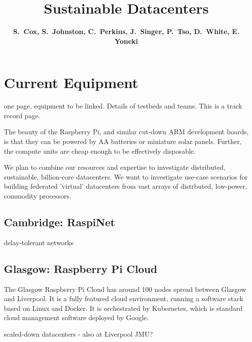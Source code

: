 \documentclass[a4paper,11pt]{article}
\begin{document}
\title{\Large \bfseries Sustainable Datacenters \vspace{-4mm}}
\author{\vspace{-5mm} \textbf{\normalsize S.\ Cox, S.\ Johnston, C.\ Perkins, J.\ Singer,  P.\ Tso, D.\ White, E. Yoneki}}
\date{\vspace{-6mm}}
\maketitle
\vspace{-5mm}
%
%
\section{Current Equipment}


one page, equipment to be linked.
Details of testbeds and teams. This is a track record page.

The beauty of the Raspberry Pi, and similar cut-down ARM development boards, is that they can be powered by AA batteries or miniature solar panels. Further, the compute units are cheap enough to be effectively disposable.

We plan to combine our resources and expertise to investigate distributed, sustainable, billion-core datacenters.
We want to investigate use-case scenarios for building federated 'virtual' datacenters from vast arrays of distrbuted, low-power, commodity processors.


\subsection{Cambridge: RaspiNet}

delay-tolerant networks
\cite{yoneki2014raspinet}

\subsection{Glasgow: Raspberry Pi Cloud}

The Glasgow Raspberry Pi Cloud has around 100 nodes spread between Glasgow and Liverpool. It is a fully featured cloud environment, running a software stack based on Linux and Docker. It is orchestrated by Kubernetes, which is standard cloud management software deployed by Google. 

scaled-down datacenters
\cite{tso2013glasgow}
- also at Liverpool JMU?
\end{document}
